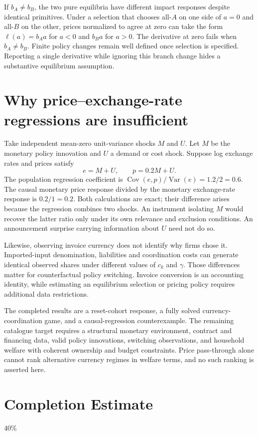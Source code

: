 \documentclass[11pt,a4paper]{article}
\DeclareMathOperator{\Var}{Var}
\DeclareMathOperator{\Cov}{Cov}
\begin{document}
If $b_A\ne b_B$, the two pure equilibria have different impact responses despite identical primitives. Under a selection that chooses all-$A$ on one side of $a=0$ and all-$B$ on the other, prices normalized to agree at zero can take the form $\ell(a)=b_Aa$ for $a<0$ and $b_Ba$ for $a>0$. The derivative at zero fails when $b_A\ne b_B$. Finite policy changes remain well defined once selection is specified. Reporting a single derivative while ignoring this branch change hides a substantive equilibrium assumption.

\section{Why price--exchange-rate regressions are insufficient}
Take independent mean-zero unit-variance shocks $M$ and $U$. Let $M$ be the monetary policy innovation and $U$ a demand or cost shock. Suppose log exchange rates and prices satisfy
\[
 e=M+U,\qquad p=0.2M+U.
\]
The population regression coefficient is $\Cov(e,p)/\Var(e)=1.2/2=0.6$. The causal monetary price response divided by the monetary exchange-rate response is $0.2/1=0.2$. Both calculations are exact; their difference arises because the regression combines two shocks. An instrument isolating $M$ would recover the latter ratio only under its own relevance and exclusion conditions. An announcement surprise carrying information about $U$ need not do so.

Likewise, observing invoice currency does not identify why firms chose it. Imported-input denomination, liabilities and coordination costs can generate identical observed shares under different values of $c_k$ and $\gamma$. Those differences matter for counterfactual policy switching. Invoice conversion is an accounting identity, while estimating an equilibrium selection or pricing policy requires additional data restrictions.

The completed results are a reset-cohort response, a fully solved currency-coordination game, and a causal-regression counterexample. The remaining catalogue target requires a structural monetary environment, contract and financing data, valid policy innovations, switching observations, and household welfare with coherent ownership and budget constraints. Price pass-through alone cannot rank alternative currency regimes in welfare terms, and no such ranking is asserted here.

\section{Completion Estimate}
40\%
\end{document}
